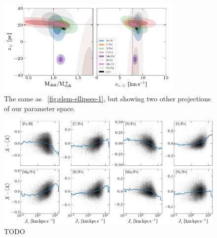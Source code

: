 \documentclass[modern]{aastex63}
\begin{document}
\begin{figure}[!tp]
  \begin{mdframed}[style=figure]
  \begin{center}
  \includegraphics[width=0.8\textwidth]{M-z-vz-z-error-ellipses.pdf}
  \end{center}
  \caption{%
  The same as \figurename~\ref{fig:elem-ellipses-1}, but showing two other
  projections of our parameter space.
  \label{fig:elem-ellipses-2}
  }
  \end{mdframed}
\end{figure}

\begin{figure}[!tp]
  \begin{mdframed}[style=figure]
  \begin{center}
  \includegraphics[width=\textwidth]{elem-Jz-gradients.pdf}
  \end{center}
  \caption{%
    TODO
  \label{fig:elem-Jz-gradients}
  }
  \end{mdframed}
\end{figure}
\end{document}
